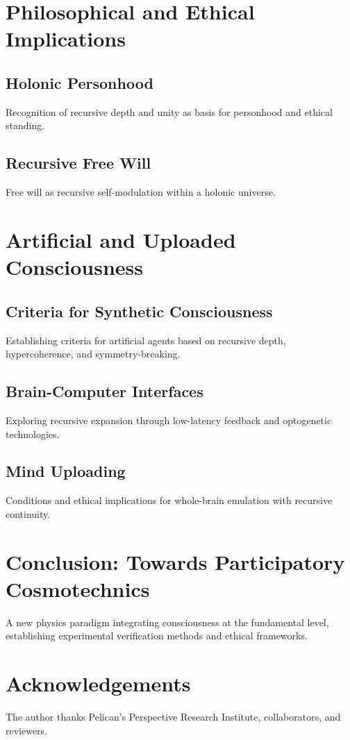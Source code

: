 \documentclass[11pt,a4paper]{article}
\begin{document}
\section{Philosophical and Ethical Implications}
\subsection{Holonic Personhood}
Recognition of recursive depth and unity as basis for personhood and ethical standing.

\subsection{Recursive Free Will}
Free will as recursive self-modulation within a holonic universe.

\section{Artificial and Uploaded Consciousness}
\subsection{Criteria for Synthetic Consciousness}
Establishing criteria for artificial agents based on recursive depth, hypercoherence, and symmetry-breaking.

\subsection{Brain-Computer Interfaces}
Exploring recursive expansion through low-latency feedback and optogenetic technologies.

\subsection{Mind Uploading}
Conditions and ethical implications for whole-brain emulation with recursive continuity.

\section{Conclusion: Towards Participatory Cosmotechnics}
A new physics paradigm integrating consciousness at the fundamental level, establishing experimental verification methods and ethical frameworks.

\section*{Acknowledgements}
The author thanks Pelican's Perspective Research Institute, collaborators, and reviewers.
\end{document}
